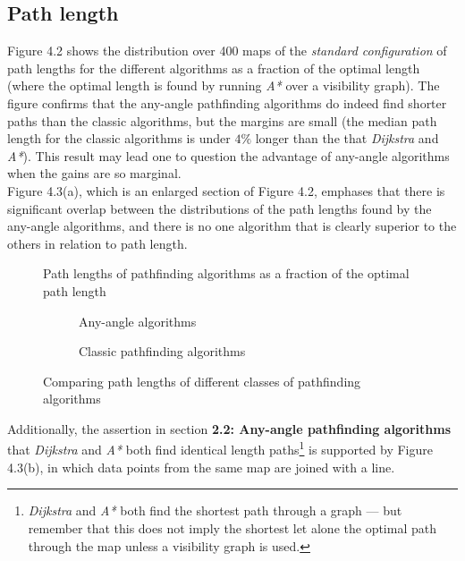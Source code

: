 \documentclass[12pt,notitlepage]{report}
\begin{document}
\subsection{Path length}
Figure 4.2 shows the distribution over 400 maps of the {\em standard configuration} of path lengths for the different algorithms  as a fraction of the optimal length (where the optimal length is found by running {\em A*} over a visibility graph).  The figure confirms that the any-angle pathfinding algorithms do indeed find shorter paths than the classic algorithms, but the margins are small (the median path length for the classic algorithms is under $4\%$ longer than the that {\em Dijkstra} and {\em A*}). This result may lead one to question the advantage of any-angle algorithms when the gains are so marginal.\\

\noindent
Figure 4.3(a), which is an enlarged section of Figure 4.2, emphases that there is significant overlap between the distributions of the path lengths found by the any-angle algorithms, and there is no one algorithm that is clearly superior to the others in relation to path length.\\

\begin{figure}
\centering

\caption[Path lengths computed by pathfinding algorithms]{Path lengths of pathfinding algorithms as a fraction of the optimal path length}
\end{figure}

\begin{figure}
\centering
  \begin{subfigure}{0.49\textwidth}
  \centering
  
  \caption{Any-angle algorithms}
  \end{subfigure}
  \begin{subfigure}{0.49\textwidth}
  \centering
  
  \caption{Classic pathfinding algorithms}
  \end{subfigure}
\caption{Comparing path lengths of different classes of pathfinding algorithms}
\end{figure}

\noindent
Additionally, the assertion in section {\bfseries 2.2: Any-angle pathfinding algorithms} that {\em Dijkstra} and {\em A*} both find identical length paths\footnote{{\em Dijkstra} and {\em A*} both find the shortest path through a graph --- but remember that this does not imply the shortest let alone the optimal path through the map unless a visibility graph is used.} is supported by Figure 4.3(b), in which data points from the same map are joined with a line.
\end{document}
